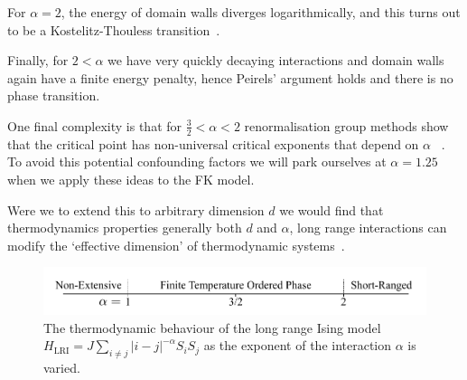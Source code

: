 For \(\alpha = 2\), the energy of domain walls diverges logarithmically, and this turns out to be a Kostelitz-Thouless transition~\autocite{thoulessLongRangeOrderOneDimensional1969}.

Finally, for \(2 < \alpha\) we have very quickly decaying interactions and domain walls again have a finite energy penalty, hence Peirels' argument holds and there is no phase transition.

One final complexity is that for \(\tfrac{3}{2} < \alpha < 2\) renormalisation group methods show that the critical point has non-universal critical exponents that depend on \(\alpha\) ~\autocite{fisherCriticalExponentsLongRange1972}. To avoid this potential confounding factors we will park ourselves at \(\alpha = 1.25\) when we apply these ideas to the FK model.

Were we to extend this to arbitrary dimension \(d\) we would find that thermodynamics properties generally both \(d\) and \(\alpha\), long range interactions can modify the `effective dimension' of thermodynamic systems~\autocite{angeliniRelationsShortrangeLongrange2014}.

\hypertarget{fig:alpha_diagram}{%
\begin{figure}
\centering
\includegraphics[width=1\textwidth,height=\textheight]{figure_code/background_chapter/alpha_diagram}
\caption[{Long Range Ising Model Behaviour}]{The thermodynamic behaviour of the long range Ising model \(H_{\mathrm{LRI}} = J \sum_{i\neq j} |i - j|^{-\alpha} S_i S_j\) as the exponent of the interaction \(\alpha\) is varied.}
\label{fig:alpha_diagram}
\end{figure}
}
